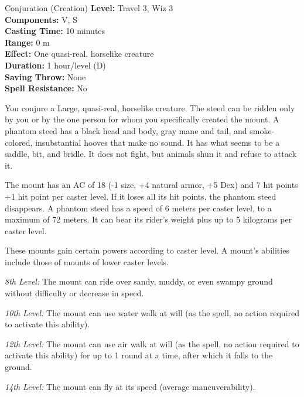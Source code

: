 {Conjuration (Creation)}
{
	\textbf{Level:}
	Travel 3, Wiz 3\\
	\textbf{Components:}
	V, S\\
	\textbf{Casting Time:}
	10 minutes\\
	\textbf{Range:}
	0 m\\
	\textbf{Effect:}
	One quasi-real, horselike creature\\
	\textbf{Duration:}
	1 hour/level (D)\\
	\textbf{Saving Throw:}
	None\\
	\textbf{Spell Resistance:}
	No\\
}
{
	You conjure a Large, quasi-real, horselike creature. The steed can be ridden only by you or by the one person for whom you specifically created the mount. A phantom steed has a black head and body, gray mane and tail, and smoke-colored, insubstantial hooves that make no sound. It has what seems to be a saddle, bit, and bridle. It does not fight, but animals shun it and refuse to attack it.

	The mount has an AC of 18 (-1 size, +4 natural armor, +5 Dex) and 7 hit points +1 hit point per caster level. If it loses all its hit points, the phantom steed disappears. A phantom steed has a speed of 6 meters per caster level, to a maximum of 72 meters. It can bear its rider's weight plus up to 5 kilograms per caster level.

	These mounts gain certain powers according to caster level. A mount's abilities include those of mounts of lower caster levels.

	\textit{8th Level:}
	The mount can ride over sandy, muddy, or even swampy ground without difficulty or decrease in speed.

	\textit{10th Level:}
	The mount can use water walk at will (as the spell, no action required to activate this ability).

	\textit{12th Level:}
	The mount can use air walk at will (as the spell, no action required to activate this ability) for up to 1 round at a time, after which it falls to the ground.

	\textit{14th Level:}
	The mount can fly at its speed (average maneuverability).

}
